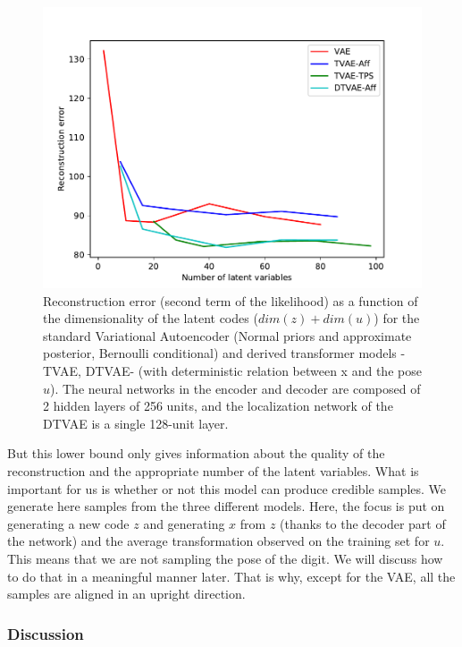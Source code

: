\documentclass[letterpaper, twoside]{article}
\begin{document}
\begin{figure}[h]
\centering
\includegraphics[scale=0.6]{num_latent.pdf}
\caption{Reconstruction error (second term of the likelihood) as a function of the dimensionality of the latent codes ($dim(z) + dim(u)$) for the standard Variational Autoencoder (Normal priors and approximate posterior, Bernoulli conditional) and derived transformer models -TVAE, DTVAE- (with deterministic relation between x and the pose $u$). The neural networks in the encoder and decoder are composed of 2 hidden layers of 256 units, and the localization network of the DTVAE is a single 128-unit layer.}
\label{numlatent}
\end{figure}

But this lower bound only gives information about the quality of the reconstruction and the appropriate number of the latent variables. What is important for us is whether or not this model can produce credible samples. We generate here samples from the three different models. Here, the focus is put on generating a new code $z$ and generating $x$ from $z$ (thanks to the decoder part of the network) and the average transformation observed on the training set for $u$. This means that we are not sampling the pose of the digit. We will discuss how to do that in a meaningful manner later. That is why, except for the VAE, all the samples are aligned in an upright direction.\\


\subsubsection{Discussion}
\end{document}
